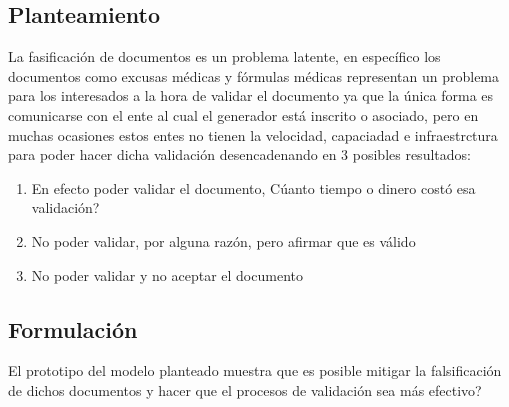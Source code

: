 \subsection{Planteamiento}
La fasificación de documentos es un problema latente, en específico los documentos como excusas médicas y  fórmulas médicas representan un problema para los interesados a la hora de validar el documento ya que la única forma es comunicarse con el ente al cual el generador está inscrito o asociado, pero en muchas ocasiones estos entes no tienen la velocidad, capaciadad e infraestrctura para poder hacer dicha validación desencadenando en 3 posibles  resultados:
\begin{enumerate}
\item En efecto poder validar el documento, Cúanto tiempo o dinero costó esa validación?
\item No poder validar, por alguna razón, pero afirmar que es válido
\item No poder validar y no aceptar el documento
\end{enumerate}

\subsection{Formulación}
El prototipo del modelo planteado muestra que es posible mitigar la falsificación de dichos documentos y hacer que el procesos de validación sea más efectivo?

